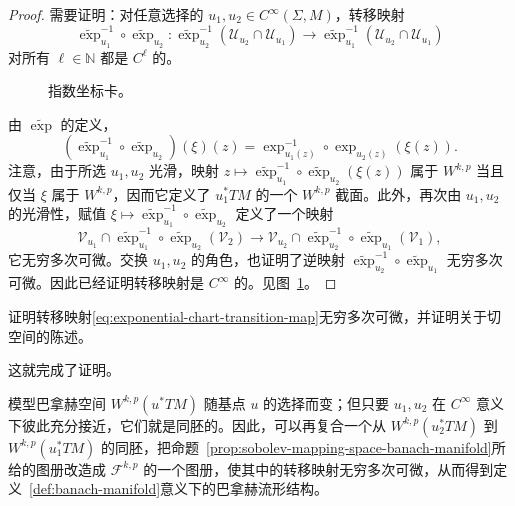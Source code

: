 \begin{proof}
需要证明：对任意选择的
$u_1,u_2\in C^\infty(\Sigma,M)$，转移映射
\[
 \widetilde{\exp}_{u_1}^{-1}\circ\widetilde{\exp}_{u_2}:
 \widetilde{\exp}_{u_2}^{-1}(\mathcal U_{u_2}\cap\mathcal U_{u_1})
 \longrightarrow
 \widetilde{\exp}_{u_1}^{-1}(\mathcal U_{u_2}\cap\mathcal U_{u_1})
\]
对所有 $\ell\in\mathbb N$ 都是 $C^\ell$ 的。

\begin{figure}[htbp]
 \centering
 
 \caption{指数坐标卡。}
 \label{fig:exponential-chart}
\end{figure}

由 $\widetilde{\exp}$ 的定义，
\[
 (\widetilde{\exp}_{u_1}^{-1}\circ
 \widetilde{\exp}_{u_2})(\xi)(z)
 =\exp_{u_1(z)}^{-1}\circ\exp_{u_2(z)}(\xi(z)).
\]
注意，由于所选 $u_1,u_2$ 光滑，映射
$z\mapsto\widetilde{\exp}_{u_1}^{-1}\circ
\widetilde{\exp}_{u_2}(\xi(z))$ 属于 $W^{k,p}$ 当且仅当
$\xi$ 属于 $W^{k,p}$，因而它定义了 $u_1^*TM$ 的一个 $W^{k,p}$ 截面。此外，再次由 $u_1,u_2$ 的光滑性，赋值
$\xi\mapsto\widetilde{\exp}_{u_1}^{-1}\circ
\widetilde{\exp}_{u_2}$ 定义了一个映射
\begin{equation}
 \mathcal V_{u_1}\cap
 \widetilde{\exp}_{u_1}^{-1}\circ\widetilde{\exp}_{u_2}(\mathcal V_2)
 \longrightarrow
 \mathcal V_{u_2}\cap
 \widetilde{\exp}_{u_2}^{-1}\circ\widetilde{\exp}_{u_1}(\mathcal V_1),
 \label{eq:exponential-chart-transition-map}
\end{equation}
它无穷多次可微。交换 $u_1,u_2$ 的角色，也证明了逆映射
$\widetilde{\exp}_{u_2}^{-1}\circ\widetilde{\exp}_{u_1}$ 无穷多次可微。因此已经证明转移映射是 $C^\infty$ 的。见图~\ref{fig:exponential-chart}。
\end{proof}

\begin{exercise}\label{ex:smoothness-exponential-transition-map}
证明转移映射\eqref{eq:exponential-chart-transition-map}无穷多次可微，并证明关于切空间的陈述。
\end{exercise}

这就完成了证明。

\begin{remark}\label{rem:varying-model-banach-spaces}
模型巴拿赫空间 $W^{k,p}(u^*TM)$ 随基点 $u$ 的选择而变；但只要
$u_1,u_2$ 在 $C^\infty$ 意义下彼此充分接近，它们就是同胚的。因此，可以再复合一个从
$W^{k,p}(u_2^*TM)$ 到 $W^{k,p}(u_1^*TM)$ 的同胚，把命题~\ref{prop:sobolev-mapping-space-banach-manifold}所给的图册改造成 $\mathcal F^{k,p}$ 的一个图册，使其中的转移映射无穷多次可微，从而得到定义~\ref{def:banach-manifold}意义下的巴拿赫流形结构。
\end{remark}

